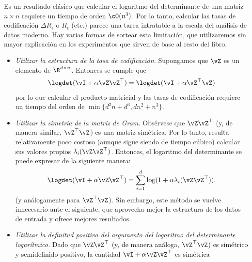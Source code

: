 \documentclass[../../book-main.tex]{subfiles}
\begin{document}
\begin{remark}
    Es un resultado clásico que calcular el logaritmo del determinante de una
    matriz \(n \times n\) requiere un tiempo de orden \(\cO(n^{3})\). Por lo tanto,
    calcular las tasas de codificación \(\Delta R_{\epsilon}\) o
    \(R_{\epsilon}\) (etc.) parece una tarea intratable a la escala del análisis de datos
    moderno. Hay varias formas de sortear esta limitación, que
    utilizaremos sin mayor explicación en los experimentos que sirven de base al resto del libro.
    \begin{itemize}
        \item \textit{Utilizar la estructura de la tasa de codificación.} Supongamos
            que \(\vZ\) es un elemento de \(\R^{d \times n}\). Entonces se cumple que
            \begin{equation}
                \logdet(\vI + \alpha \vZ\vZ^{\top}) = \logdet(\vI +
                \alpha \vZ^{\top}\vZ)
            \end{equation}
            por lo que calcular el producto matricial y las tasas de codificación
            requiere un tiempo del orden de \(\min\{d^{2}n +
            d^{3}, dn^{2} + n^{3}\}\).
        \item \textit{Utilizar la simetría de la matriz de Gram.}
            Obsérvese que \(\vZ\vZ^{\top}\) (y, de manera similar,
            \(\vZ^{\top}\vZ\)) es una matriz simétrica. Por lo tanto, resulta
            relativamente poco costoso (aunque sigue siendo de tiempo cúbico) calcular sus
            valores propios \(\lambda_{i}(\vZ\vZ^{\top})\). Entonces, el
            logaritmo del determinante se puede expresar de la siguiente manera:
            \begin{equation}
                \logdet(\vI + \alpha \vZ\vZ^{\top}) = \sum_{i =
                1}^{d}\log(1 + \alpha \lambda_{i}(\vZ\vZ^{\top})),
            \end{equation}
            (y análogamente para \(\vZ^{\top}\vZ\)). Sin embargo, este
            método se vuelve innecesario ante el siguiente, que aprovecha
            mejor la estructura de los datos de entrada y ofrece mejores resultados.
        \item \textit{Utilizar la definitud positiva del argumento del logaritmo del 
            determinante logarítmico.} Dado que \(\vZ\vZ^{\top}\) (y, de manera análoga,
            \(\vZ^{\top}\vZ\)) es simétrico y semidefinido positivo,
            la cantidad \(\vI + \alpha \vZ\vZ^{\top}\) es simétrica

\end{itemize}
\end{remark}
\end{document}
